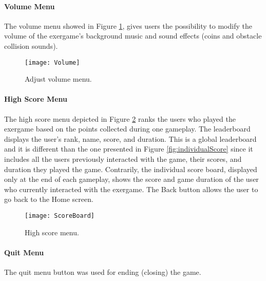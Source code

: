 \paragraph{Volume Menu}
The volume menu showed in Figure \ref{fig:volume}, gives users the possibility to modify the volume of the exergame's background music and sound effects (coins and obstacle collision sounds).\\
\begin{figure}[h]
    \centering
    \texttt{[image: Volume]}
    \caption{Adjust volume menu.}
    \label{fig:volume}
\end{figure}
\paragraph{High Score Menu}
The high score menu depicted in Figure \ref{fig:highscore} ranks the users who played the exergame based on the points collected during one gameplay. The leaderboard displays the user's rank, name, score, and duration. This is a global leaderboard and it is different than the one presented in Figure \ref{fig:individualScore} since it includes all the users previously interacted with the game, their scores, and duration they played the game. Contrarily, the individual score board, displayed only at the end of each gameplay, shows the score and game duration of the user who currently interacted with the exergame. The Back button allows the user to go back to the Home screen.
\begin{figure}[h]
    \centering
    \texttt{[image: ScoreBoard]}
    \caption{High score menu.}
    \label{fig:highscore}
\end{figure}
\paragraph{Quit Menu}
The quit menu button was used for ending (closing) the game. 
